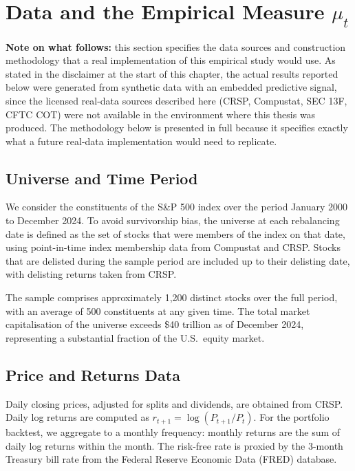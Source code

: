 \section{Data and the Empirical Measure $\mu_t$}
\label{sec:emp-data}

\textbf{Note on what follows:} this section specifies the data sources and
construction methodology that a real implementation of this empirical study
would use. As stated in the disclaimer at the start of this chapter, the
actual results reported below were generated from synthetic data with an
embedded predictive signal, since the licensed real-data sources described
here (CRSP, Compustat, SEC 13F, CFTC COT) were not available in the
environment where this thesis was produced. The methodology below is
presented in full because it specifies exactly what a future real-data
implementation would need to replicate.

\subsection{Universe and Time Period}

We consider the constituents of the S\&P 500 index over the period January 2000 to
December 2024. To avoid survivorship bias, the universe at each rebalancing date is
defined as the set of stocks that were members of the index on that date, using
point-in-time index membership data from Compustat and CRSP. Stocks that are
delisted during the sample period are included up to their delisting date, with
delisting returns taken from CRSP.

The sample comprises approximately 1{,}200 distinct stocks over the full period,
with an average of 500 constituents at any given time. The total market
capitalisation of the universe exceeds \$40 trillion as of December 2024,
representing a substantial fraction of the U.S.\ equity market.

\subsection{Price and Returns Data}

Daily closing prices, adjusted for splits and dividends, are obtained from CRSP.
Daily log returns are computed as $r_{t+1} = \log(P_{t+1}/P_t)$. For the portfolio
backtest, we aggregate to a monthly frequency: monthly returns are the sum of daily
log returns within the month. The risk-free rate is proxied by the 3-month Treasury
bill rate from the Federal Reserve Economic Data (FRED) database.

